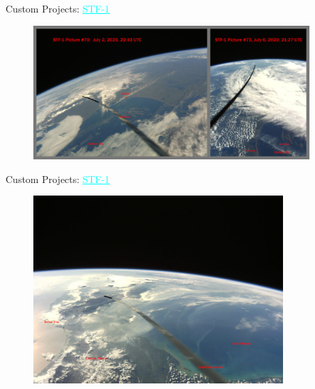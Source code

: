 \begin{frame}{Custom Projects: \href{http://stf1.com/}{\textcolor{cyan}{\underline{STF-1}}}}

    \begin{figure}[!ht]
        \begin{center}
            \includegraphics[width=10.5cm]{figures/stf-1-ex1.jpg}
        \end{center}
    \end{figure}

\end{frame}

\begin{frame}{Custom Projects: \href{http://stf1.com/}{\textcolor{cyan}{\underline{STF-1}}}}

    \begin{figure}[!ht]
        \begin{center}
            \includegraphics[width=9.5cm]{figures/stf-1-ex2.jpg}
        \end{center}
    \end{figure}

\end{frame}

